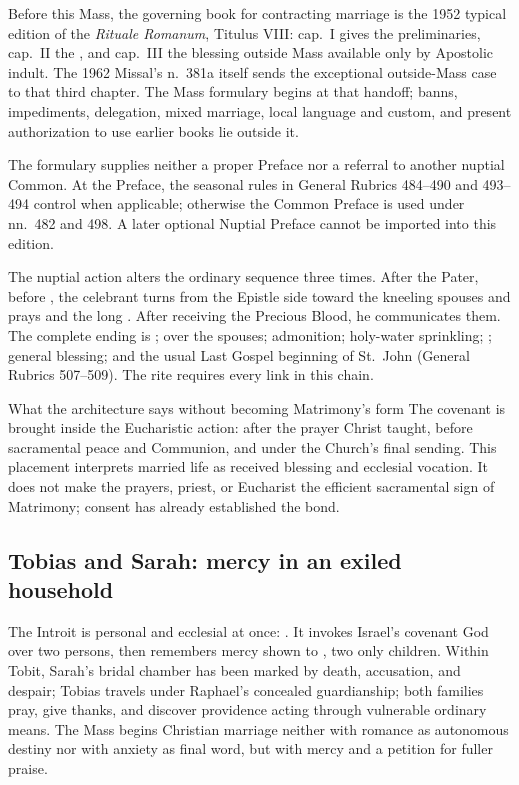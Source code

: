 Before this Mass, the governing book for contracting marriage is the 1952 typical edition of the \emph{Rituale Romanum}, Titulus VIII: cap.~I gives the preliminaries, cap.~II the , and cap.~III the blessing outside Mass available only by Apostolic indult. The 1962 Missal's n.~381a itself sends the exceptional outside-Mass case to that third chapter. The Mass formulary begins at that handoff; banns, impediments, delegation, mixed marriage, local language and custom, and present authorization to use earlier books lie outside it.

The formulary supplies neither a proper Preface nor a referral to another nuptial Common. At the Preface, the seasonal rules in General Rubrics 484--490 and 493--494 control when applicable; otherwise the Common Preface is used under nn.~482 and 498. A later optional Nuptial Preface cannot be imported into this edition.

The nuptial action alters the ordinary sequence three times. After the Pater, before , the celebrant turns from the Epistle side toward the kneeling spouses and prays  and the long . After receiving the Precious Blood, he communicates them. The complete ending is ;  over the spouses; admonition; holy-water sprinkling; ; general blessing; and the usual Last Gospel beginning of St.~John (General Rubrics 507--509). The rite requires every link in this chain.

\begin{massbox}{What the architecture says without becoming Matrimony's form}
The covenant is brought inside the Eucharistic action: after the prayer Christ taught, before sacramental peace and Communion, and under the Church's final sending. This placement interprets married life as received blessing and ecclesial vocation. It does not make the prayers, priest, or Eucharist the efficient sacramental sign of Matrimony; consent has already established the bond.
\end{massbox}

\sectionguard
\subsection*{Tobias and Sarah: mercy in an exiled household\enspace{}}

The Introit is personal and ecclesial at once: . It invokes Israel's covenant God over two persons, then remembers mercy shown to , two only children. Within Tobit, Sarah's bridal chamber has been marked by death, accusation, and despair; Tobias travels under Raphael's concealed guardianship; both families pray, give thanks, and discover providence acting through vulnerable ordinary means. The Mass begins Christian marriage neither with romance as autonomous destiny nor with anxiety as final word, but with mercy and a petition for fuller praise.

